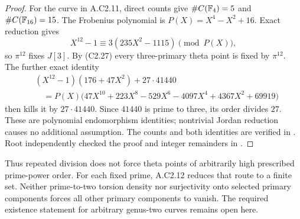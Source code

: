 \begin{proof}
For the curve in A.C2.11, direct counts give
$\#C(\mathbb F_4)=5$ and $\#C(\mathbb F_{16})=15$. The Frobenius
polynomial is $P(X)=X^4-X^2+16$. Exact reduction gives
\[
          X^{12}-1\equiv3(235X^2-1115)\pmod{P(X)},
\]
so $\pi^{12}$ fixes $J[3]$. By (C2.27) every three-primary
theta point is fixed by $\pi^{12}$. The further exact identity
\[
\begin{aligned}
 &(X^{12}-1)(176+47X^2)+27\cdot41440\\
 &\quad=P(X)\bigl(47X^{10}+223X^8-529X^6-4097X^4
                              +4367X^2+69919\bigr)
\end{aligned}                                                     \tag{C2.28}
\]
then kills it by $27\cdot41440$. Since $41440$ is prime to
three, its order divides $27$. These are polynomial
endomorphism identities; nontrivial Jordan reduction causes
no additional assumption. The counts and both identities are
verified in .
Root independently checked the proof and integer remainders
in .
\end{proof}

Thus repeated division does not force theta points of arbitrarily
high prescribed prime-power order. For each fixed prime, A.C2.12
reduces that route to a finite set. Neither prime-to-two torsion
density nor surjectivity onto selected primary components forces
all other primary components to vanish. The required existence
statement for arbitrary genus-two curves remains open here.
